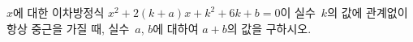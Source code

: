 $x$에 대한 이차방정식 $x^2+2(k+a)x+k^2+6k+b=0$이 실수~$k$의 값에 관계없이 항상 중근을 가질 때, 실수~$a$, $b$에 대하여 $a+b$의 값을 구하시오.
